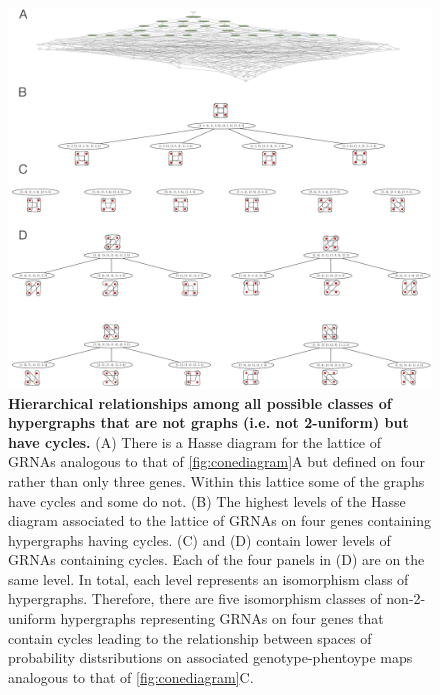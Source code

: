 \begin{figure}[!ht]
\centering
\noindent\includegraphics[width=1.0\columnwidth]{fig/non2uniformcyclichypergraphhasse.pdf}
\caption{{\bf Hierarchical relationships among all possible classes of hypergraphs that are not graphs (i.e. not 2-uniform) but have cycles.} (A) There is a Hasse diagram for the lattice of GRNAs analogous to that of \ref{fig:conediagram}A but defined on four rather than only three genes. Within this lattice some of the graphs have cycles and some do not. (B) The highest levels of the Hasse diagram associated to the lattice of GRNAs on four genes containing hypergraphs having cycles. (C) and (D) contain lower levels of GRNAs containing cycles. Each of the four panels in (D) are on the same level. In total, each level represents an isomorphism class of hypergraphs. Therefore, there are five isomorphism classes of non-2-uniform hypergraphs representing GRNAs on four genes that contain cycles leading to the relationship between spaces of probability distsributions on associated genotype-phentoype maps analogous to that of \ref{fig:conediagram}C.}
\label{fig:non2uniformcyclichypergraphhasse}
\end{figure}





